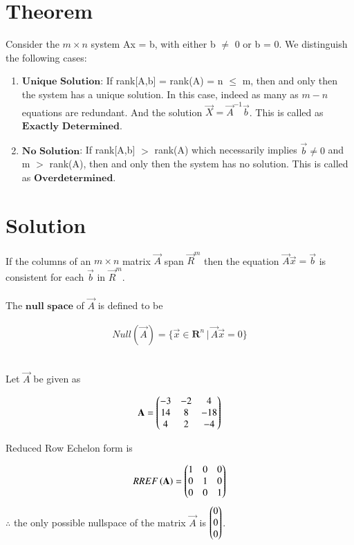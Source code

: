 \documentclass[journal,12pt,twocolumn]{IEEEtran}
\begin{document}
	
	\section{Theorem}
	
	\begin{theorem}\label{thm1}
		Consider the $m\times n$ system Ax = b, with either b $\neq$ 0 or b = 0. We distinguish the following cases:
		\begin{enumerate}
			\item $\textbf{Unique Solution}$: If rank[A,b] = rank(A) = n $\leq$ m, then and only then the system has a unique solution. In this case, indeed as many as $m-n$ equations are redundant. And the solution $\vec{X} = {\vec{A}^{-1}\vec{b}}$. This is called as $\textbf{Exactly Determined}$.
			\item $\textbf{No Solution}$: If rank[A,b] $>$ rank(A) which necessarily implies $\Vec{b} \neq 0$ and m $>$ rank(A), then and only then the system has no solution. This is called as $\textbf{Overdetermined}$.
		\end{enumerate}
	\end{theorem}
	
	
	\section{\textbf{Solution}}
	If the columns of an $m\times n$ matrix $\Vec{A}$ span $\vec{R}^{m}$ then the equation $\vec{A}\vec{x}=\vec{b}$ is consistent for each $\Vec{b}$ in $\vec{R}^{m}$. \\ \\
	The $\textbf{null space}$ of $\vec{A}$ is defined to be 
	
	\begin{align}\label{eq1}
		Null(\vec{A}) = \{ \vec{x} \in \mathbf{R}^{n} \, \vert \, \vec{A}\vec{x} = 0 \}
	\end{align}
	
	
	\\
	
	Let $\vec{A}$ be given as
	
	\begin{align} \label{eq2}
		\mathbf{A} = \begin{pmatrix}-3&-2&4 \\ 14&8&-18 \\ 4&2&-4\end{pmatrix}
	\end{align}
	
	Reduced Row Echelon form is
	
	\begin{align}
		RREF\left(\mathbf{A}\right) = \begin{pmatrix}1&0&0 \\ 0&1&0 \\ 0&0&1\end{pmatrix}
	\end{align}
	$\therefore$ the only possible nullspace of the matrix $\vec{A}$ is $\begin{pmatrix}0\\0\\0\end{pmatrix}$.\\
	
\end{document}
